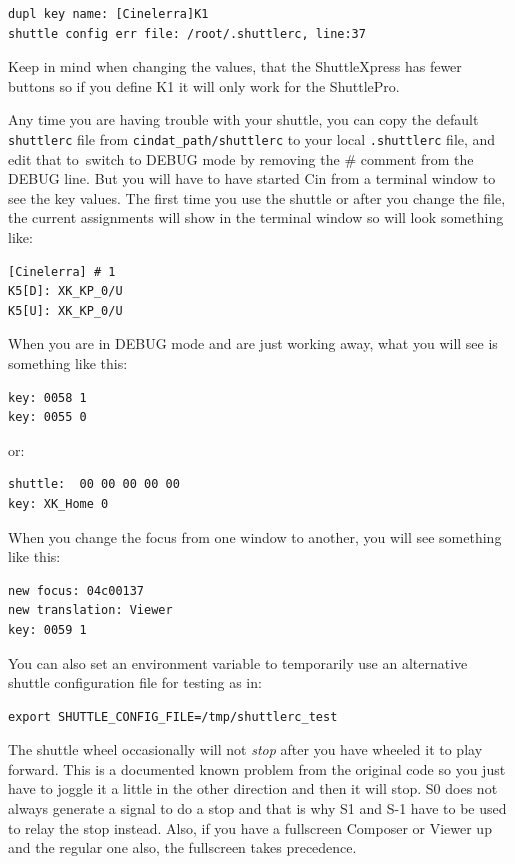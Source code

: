 \begin{lstlisting}[style=sh]
dupl key name: [Cinelerra]K1
shuttle config err file: /root/.shuttlerc, line:37
\end{lstlisting}

Keep in mind when changing the values, that the ShuttleXpress has
fewer buttons so if you define K1 it will only work for the
ShuttlePro.

Any time you are having trouble with your shuttle, you can copy the
default \texttt{shuttlerc} file from
\texttt{{cindat\_path}/shuttlerc} to your local \texttt{.shuttlerc}
file, and edit that to\ switch to DEBUG mode by removing the \#
comment from the DEBUG line.  But you will have to have started Cin
from a terminal window to see the key values. The first time you use
the shuttle or after you change the file, the current assignments
will show in the terminal window so will look something like:

\begin{lstlisting}[style=sh]
[Cinelerra] # 1
K5[D]: XK_KP_0/U
K5[U]: XK_KP_0/U
\end{lstlisting}

When you are in DEBUG mode and are just working away, what you will
see is something like this:

\begin{lstlisting}[style=sh]
key: 0058 1
key: 0055 0
\end{lstlisting}

or:

\begin{lstlisting}[style=sh]
shuttle:  00 00 00 00 00
key: XK_Home 0
\end{lstlisting}

When you change the focus from one window to another, you will see
something like this:

\begin{lstlisting}[style=sh]
new focus: 04c00137
new translation: Viewer
key: 0059 1
\end{lstlisting}

You can also set an environment variable to temporarily use an
alternative shuttle configuration file for testing as in:

\begin{lstlisting}[style=sh]
export SHUTTLE_CONFIG_FILE=/tmp/shuttlerc_test
\end{lstlisting}

The shuttle wheel occasionally will not \textit{stop} after you have
wheeled it to play forward.  This is a documented known problem from
the original code so you just have to joggle it a little in the
other direction and then it will stop.  S0 does not always generate
a signal to do a stop and that is why S1 and S-1 have to be used to
relay the stop instead.  Also, if you have a fullscreen Composer or
Viewer up and the regular one also, the fullscreen takes precedence.


